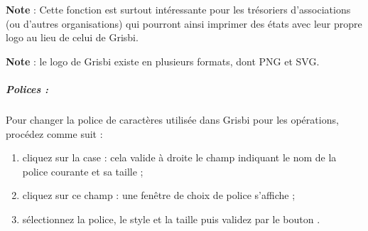 \textbf{Note} : Cette fonction est surtout intéressante pour les trésoriers d'associations (ou d'autres organisations) qui pourront ainsi imprimer des états avec leur propre logo au lieu de celui de Grisbi.

\textbf{Note} : le logo de Grisbi existe en plusieurs formats, dont \gls{PNG} et \gls{SVG}.



\subparagraph{Polices :\label{setup-display-logo-fonts}}

Pour changer la police de caractères utilisée dans Grisbi pour les opérations, procédez comme suit :

\begin{enumerate}
	\item cliquez sur la case  : cela valide à droite le champ indiquant le nom de la police courante et sa taille ;
	\item cliquez sur ce champ : une fenêtre de choix de police s'affiche ;
	\item sélectionnez la police, le style et la taille puis validez par le bouton .
\end{enumerate}

